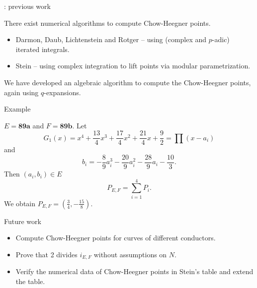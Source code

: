 \documentclass[handout]{beamer}
\begin{document}
\begin{frame}{\insertsubsection : previous work}


There exist numerical algorithms to compute Chow-Heegner points.  

\medskip 

\begin{itemize}
\item Darmon, Daub, Lichtenstein and Rotger -- using (complex and $p$-adic) iterated integrals. 
\item Stein  -- using complex integration to lift points via modular parametrization. 
\end{itemize}

We have developed an algebraic algorithm to compute the Chow-Heegner points,  again using $q$-expansions.

\end{frame}


\begin{frame}{Example}

\begin{Example}
$E = \textbf{89a}$ and $F = \textbf{89b}$. Let
$$G_1(x) = x^{4} + \frac{13}{4} x^{3} + \frac{17}{4} x^{2} + \frac{21}{4} x + \frac{9}{2}=  \prod (x-a_i)$$ and $$b_i = -\frac{8}{9} a_i^{3} - \frac{20}{9} a_i^{2} - \frac{28}{9} a_i - \frac{10}{3}.$$ Then $(a_i,b_i) \in E$
	$$P_{E,F} = \sum_{i=1}^4 P_i. $$
We obtain $P_{E,F} = (\frac{3}{4},-\frac{15}{8})$. 
\end{Example}


\end{frame}

\begin{frame}{Future work}

\begin{itemize}
\item Compute Chow-Heegner points for curves of different conductors. 
\item Prove that 2 divides $i_{E,F}$  without assumptions on $N$. 
\item Verify the numerical data of Chow-Heegner points in Stein's table and extend the table.
\end{itemize}

\end{frame}
\end{document}
